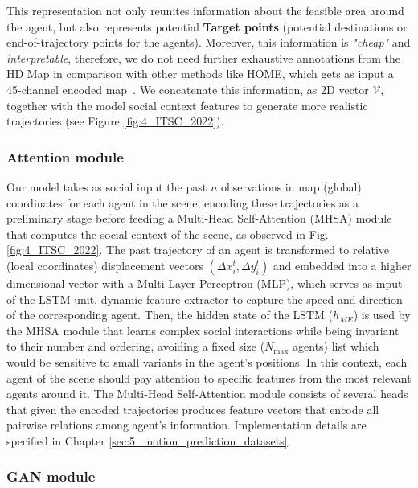 This representation not only reunites information about the feasible area around the agent, but also represents potential \textbf{Target points} \cite{dendorfer2020goal} (\ie potential destinations or end-of-trajectory points for the agents). Moreover, this information is \textit{"cheap"} and \textit{interpretable}, therefore, we do not need further exhaustive annotations from the HD Map in comparison with other methods like HOME, which gets as input a 45-channel encoded map~\cite{gilles2021home}.
%
We concatenate this information, as 2D vector $\mathcal{V}$, together with the model social context features to generate more realistic trajectories (see Figure \ref{fig:4_ITSC_2022}).

\subsubsection{Attention module}

Our model takes as social input the past $n$ observations in map (global) coordinates for each agent in the scene, encoding these trajectories as a preliminary stage before feeding a Multi-Head Self-Attention (MHSA) \cite{vaswani2017attention} module that computes the social context of the scene, as observed in Fig. \ref{fig:4_ITSC_2022}. The past trajectory of an agent is transformed to relative (local coordinates) displacement vectors $\left( \Delta x_i^t, \Delta y_i^t \right)$ and embedded into a higher dimensional vector with a Multi-Layer Perceptron (MLP), which serves as input of the LSTM unit, dynamic feature extractor to capture the speed and direction of the corresponding agent. Then, the hidden state of the LSTM ($h_{M\!E}$) is used by the MHSA module that learns complex social interactions while being invariant to their number and ordering, avoiding a fixed size ($N_{\text{max}}$ agents) list which would be sensitive to small variants in the agent's positions. In this context, each agent of the scene should pay attention to specific features from the most relevant agents around it. The Multi-Head Self-Attention module consists of several heads that given the encoded trajectories produces feature vectors that encode all pairwise relations among agent's information. Implementation details are specified in Chapter \ref{sec:5_motion_prediction_datasets}.

\subsubsection{GAN module}

